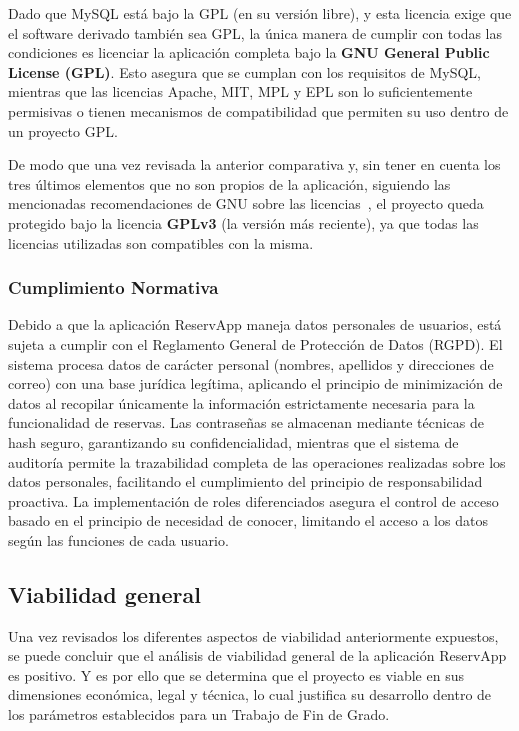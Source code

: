 Dado que MySQL está bajo la GPL (en su versión libre), y esta licencia exige que el software derivado también sea GPL, la única manera de cumplir con todas las condiciones es licenciar la aplicación completa bajo la \textbf{GNU General Public License (GPL)}. Esto asegura que se cumplan con los requisitos de MySQL, mientras que las licencias Apache, MIT, MPL y EPL son lo suficientemente permisivas o tienen mecanismos de compatibilidad que permiten su uso dentro de un proyecto GPL.

De modo que una vez revisada la anterior comparativa y, sin tener en cuenta los tres últimos elementos que no son propios de la aplicación, siguiendo las mencionadas recomendaciones de GNU sobre las licencias~\cite{gnu}, el proyecto queda protegido bajo la licencia \textbf{GPLv3} (la versión más reciente), ya que todas las licencias utilizadas son compatibles con la misma.

\subsubsection{Cumplimiento Normativa}
Debido a que la aplicación ReservApp maneja datos personales de usuarios, está sujeta a cumplir con el Reglamento General de Protección de Datos (RGPD). El sistema procesa datos de carácter personal (nombres, apellidos y direcciones de correo) con una base jurídica legítima, aplicando el principio de minimización de datos al recopilar únicamente la información estrictamente necesaria para la funcionalidad de reservas. Las contraseñas se almacenan mediante técnicas de hash seguro, garantizando su confidencialidad, mientras que el sistema de auditoría permite la trazabilidad completa de las operaciones realizadas sobre los datos personales, facilitando el cumplimiento del principio de responsabilidad proactiva. La implementación de roles diferenciados asegura el control de acceso basado en el principio de necesidad de conocer, limitando el acceso a los datos según las funciones de cada usuario.

\subsection{Viabilidad general}
Una vez revisados los diferentes aspectos de viabilidad anteriormente expuestos, se puede concluir que el análisis de viabilidad general de la aplicación ReservApp es positivo. Y es por ello que se determina que el proyecto es viable en sus dimensiones económica, legal y técnica, lo cual justifica su desarrollo dentro de los parámetros establecidos para un Trabajo de Fin de Grado.
